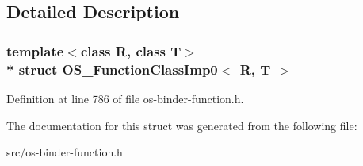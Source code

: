 \subsection{Detailed Description}
\subsubsection*{template$<$class R, class T$>$\\*
struct O\+S\+\_\+\+Function\+Class\+Imp0$<$ R, T $>$}



Definition at line 786 of file os-\/binder-\/function.\+h.



The documentation for this struct was generated from the following file\+:\begin{DoxyCompactItemize}
\item 
src/os-\/binder-\/function.\+h\end{DoxyCompactItemize}
